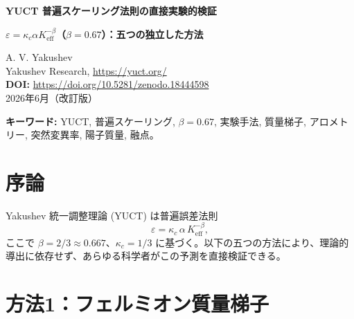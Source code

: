 \documentclass[12pt,a4paper]{article}
\newcommand{\Ke}{K_{\mathrm{eff}}}
\begin{document}
	
	\begin{center}
		{\Large \textbf{YUCT 普遍スケーリング法則の直接実験的検証}}
	\end{center}
	\begin{center}
		{\Large \textbf{\(\varepsilon = \kappa_c \alpha \Ke^{-\beta}\)（\(\beta = 0.67\)）：五つの独立した方法}}
	\end{center}
	
	\vspace{0.5cm}
	\noindent
	A. V. Yakushev\\
	Yakushev Research, \url{https://yuct.org/}\\
	\vspace{0.3cm}
	\textbf{DOI:} \url{https://doi.org/10.5281/zenodo.18444598}\\
	\noindent
	2026年6月（改訂版）
	
	\vspace{0.5cm}
	
	\begin{abstract}
		\noindent
		本ノートは、Yakushev 統一調整理論 (YUCT) の中心的予測である普遍的誤差スケーリング指数 \(\beta = 0.67\) を直接確認できる、五つの独立した数値検証済み実験手法を提示する。各手法は公開データのみを使用し、電卓のみを必要とし、学部学生が半日で再現可能である。検証は素粒子物理学、生物学、進化遺伝学、材料科学にわたる。
	\end{abstract}
	
	\vspace{0.5cm}
	
	\noindent
	\textbf{キーワード:} YUCT, 普遍スケーリング, \(\beta = 0.67\), 実験手法, 質量梯子, アロメトリー, 突然変異率, 陽子質量, 融点。
	
	\section{序論}
	
	Yakushev 統一調整理論 (YUCT) は普遍誤差法則
	\begin{equation}\label{eq:error-law}
		\varepsilon = \kappa_c \, \alpha \, \Ke^{-\beta},
	\end{equation}
	ここで \(\beta = 2/3 \approx 0.667\)、\(\kappa_c = 1/3\) に基づく。以下の五つの方法により、理論的導出に依存せず、あらゆる科学者がこの予測を直接検証できる。
	
	\section{方法1：フェルミオン質量梯子}
	\label{sec:massladder}
	
\end{document}
